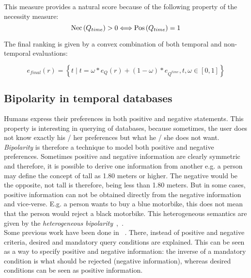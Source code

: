 This measure provides a natural score because of the following property of the necessity measure: 
\begin{equation}
\label{eq:necessity} %
\Nec \left( Q_{time} \right) > 0  \Longleftrightarrow  \Pos \left( Q_{time}\right) = 1
\end{equation}

The final ranking is given by a convex combination of both temporal and non-temporal evaluations:

\begin{equation}
\label{eq:convex-combination}
e_{final} \left( r \right) = \left \lbrace t \mid t = \omega \ast e_{Q} \left( r \right) + \left( 1- \omega \right) \ast e_{Q^{time}}, t,\omega \in \left[0,1\right] \right \rbrace
\end{equation}




\subsection{Bipolarity in temporal databases}
\label{subsubsec:bipolarity}
Humans express their preferences in both positive and negative statements. This property is interesting in querying of databases, because sometimes, the user does not know exactly his / her preferences but what he / she does not want. \emph{Bipolarity} is therefore a technique to model both positive and negative preferences. Sometimes positive and negative information are clearly symmetric and therefore, it is possible to derive one information from another e.g. a person may define the concept of tall as 1.80 meters or higher. The negative would be the opposite, not tall is therefore, being less than 1.80 meters.  But in some cases, positive information can not be obtained directly from the negative information and vice-verse. E.g. a person wants to buy a blue motorbike, this does not mean that the person would reject a black motorbike. This heterogeneous semantics are given by the \emph{heterogeneous bipolarity}~\cite{Dubois2006},~\cite{Dubois2008}.\\

Some previous work have been done in ~\cite{Lacroix87}. There, instead of positive and negative criteria, desired and mandatory query conditions are explained. This can be seen as a way to specify positive and negative information: the inverse of a mandatory condition is what should be rejected (negative information), whereas desired conditions can be seen as positive information.\\


